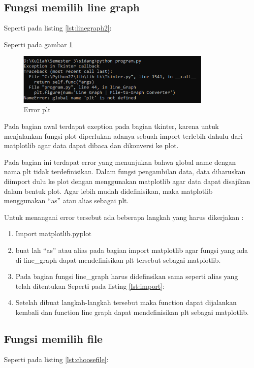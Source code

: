 \subsection{Fungsi memilih line graph}
Seperti pada listing \ref{lst:linegraph2}:


Seperti pada gambar \ref{fig:errorplt}
\begin{figure}[!htbp]
	\centerline{\includegraphics[width=0.85\textwidth]{figures/3/errorplt.PNG}}
	\caption{Error plt}
	\label{fig:errorplt}
\end{figure}

Pada bagian awal terdapat exeption pada bagian tkinter, karena untuk menjalankan fungsi plot diperlukan adanya sebuah import terlebih dahulu dari matplotlib agar data dapat dibaca dan dikonversi ke plot.

Pada bagian ini terdapat error yang menunjukan bahwa global name dengan nama plt tidak terdefinisikan. Dalam fungsi pengambilan data, data diharuskan diimport dulu ke plot dengan menggunakan matplotlib agar data dapat disajikan dalam bentuk plot. Agar lebih mudah didefinisikan, maka matplotlib menggunakan “as” atau alias sebagai plt. 

Untuk menangani error tersebut ada beberapa langkah yang harus dikerjakan :
\begin{enumerate}
\item Import matplotlib.pyplot
\item buat lah “as” atau alias pada bagian import matplotlib agar fungsi yang ada di line\_graph dapat mendefinisikan plt tersebut sebagai matplotlib.
\item Pada bagian fungsi line\_graph harus didefinsikan sama seperti alias yang telah ditentukan
Seperti pada listing \ref{lst:import}:

\item Setelah dibuat langkah-langkah tersebut maka function dapat dijalankan kembali dan function line graph dapat mendefinisikan plt sebagai matplotlib.
\end{enumerate}

\subsection{Fungsi memilih file}
Seperti pada listing \ref{lst:choosefile}:



